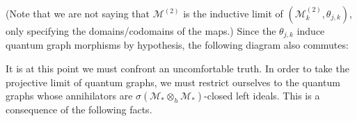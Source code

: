 \documentclass[12pt]{article}
\theoremstyle{definition}
\newcommand{\mc}[1]{\mathcal{#1}}
\newcommand{\<}{\langle}
\renewcommand{\>}{\rangle}
\newcommand{\Ann}{\text{Ann}}
\begin{document}
(Note that we are not saying that $\mc M^{(2)}$ is the inductive limit of $(\mc M_k^{(2)}, \theta_{j,k})$, only specifying the domains/codomains of the maps.) Since the $\theta_{j,k}$ induce quantum graph morphisms by hypothesis, the following diagram also commutes:
\begin{center}
\end{center}
It is at this point we must confront an uncomfortable truth. In order to take the projective limit of quantum graphs, we must restrict ourselves to the quantum graphs whose annihilators are $\sigma(\mc M_* \otimes_h \mc M_*)$-closed left ideals. This is a consequence of the following facts.
\end{document}
